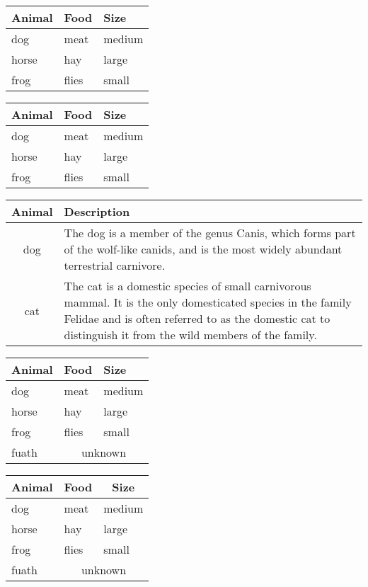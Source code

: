 \documentclass{article}
\begin{document}
	\begin{tabular}{lll}
		\toprule
		Animal & Food  & Size   \\
		\midrule
		dog    & meat  & medium \\
		\cmidrule{1-2}
		horse  & hay   & large  \\
		\cmidrule{1-1}
		\cmidrule{3-3}
		frog   & flies & small  \\
		\bottomrule
	\end{tabular}
	
	\begin{tabular}{lll}
		\toprule
		Animal & Food  & Size   \\
		\midrule
		dog    & meat  & medium \\
		\cmidrule{1-2}
		horse  & hay   & large  \\
		\cmidrule(r){1-1}
		\cmidrule(rl){2-2}
		\cmidrule(l){3-3}
		frog   & flies & small  \\
		\bottomrule
	\end{tabular}
	
	
	\begin{tabular}{cp{9cm}}
		\toprule
		Animal & Description \\
		\midrule
		dog    & The dog is a member of the genus Canis, which forms part of the
		wolf-like canids, and is the most widely abundant terrestrial
		carnivore. \\
		\addlinespace
		cat    & The cat is a domestic species of small carnivorous mammal. It is the
		only domesticated species in the family Felidae and is often referred
		to as the domestic cat to distinguish it from the wild members of the
		family. \\
		\bottomrule
	\end{tabular}
	
	\begin{tabular}{lll}
		\toprule
		Animal & Food  & Size   \\
		\midrule
		dog    & meat  & medium \\
		horse  & hay   & large  \\
		frog   & flies & small  \\
		fuath  & \multicolumn{2}{c}{unknown} \\
		\bottomrule
	\end{tabular}
	
	\begin{tabular}{lll}
		\toprule
		\multicolumn{1}{c}{Animal} & \multicolumn{1}{c}{Food} & \multicolumn{1}{c}{Size} \\
		\midrule
		dog    & meat  & medium \\
		horse  & hay   & large  \\
		frog   & flies & small  \\
		fuath  & \multicolumn{2}{c}{unknown} \\
		\bottomrule
	\end{tabular}
	
\end{document}
